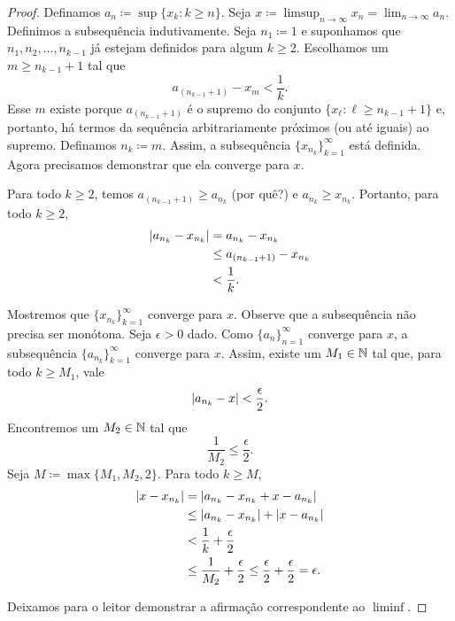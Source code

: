 \begin{proof}
Definamos $a_n \coloneqq \sup \{ x_k : k \geq n \}$.
Seja
$x \coloneqq \limsup_{n\to\infty} x_n = \lim_{n\to\infty} a_n$.
Definimos a subsequência indutivamente.
Seja $n_1 \coloneqq 1$ e suponhamos que $n_1,n_2,\ldots,n_{k-1}$ já estejam definidos para
algum $k \geq 2$. Escolhamos um $m \geq n_{k-1} + 1$
tal que
\begin{equation*}
a_{(n_{k-1}+1)} - x_m < \frac{1}{k} .
\end{equation*}
Esse $m$ existe
porque $a_{(n_{k-1}+1)}$ é o supremo do
conjunto $\{ x_\ell : \ell \geq n_{k-1} + 1 \}$ e, portanto, há termos
da sequência arbitrariamente próximos (ou até iguais) ao supremo.
Definamos $n_{k} \coloneqq m$. Assim, a subsequência $\{ x_{n_k} \}_{k=1}^\infty$ está definida. Agora
precisamos demonstrar que ela converge para $x$.

Para todo $k \geq 2$, temos
$a_{(n_{k-1}+1)} \geq a_{n_k}$ (por quê?) e $a_{n_{k}} \geq x_{n_k}$.
Portanto, para todo $k \geq 2$,
\begin{equation*}
\begin{split}
\lvert {a_{n_k} - x_{n_k}} \rvert & =
a_{n_k} - x_{n_k}
\\
& \leq
a_{(n_{k-1}+1)} - x_{n_k}
\\
& < \frac{1}{k} .
\end{split}
\end{equation*}

Mostremos que $\{ x_{n_k} \}_{k=1}^\infty$ converge para $x$.
Observe que a subsequência não precisa ser monótona. Seja $\epsilon > 0$ dado.
Como $\{ a_n \}_{n=1}^\infty$ converge para $x$, a subsequência
$\{ a_{n_k} \}_{k=1}^\infty$ converge para $x$.
Assim, existe um $M_1 \in {\mathbb{N}}$
tal que, para todo $k \geq M_1$, vale
\begin{equation*}
\lvert {a_{n_k} - x} \rvert < \frac{\epsilon}{2} .
\end{equation*}
Encontremos um $M_2 \in {\mathbb{N}}$ tal que
\begin{equation*}
\frac{1}{M_2} \leq \frac{\epsilon}{2}.
\end{equation*}
Seja $M \coloneqq \max \{M_1 , M_2 , 2 \}$. Para todo $k \geq M$,
\begin{equation*}
\begin{split}
\lvert {x- x_{n_k}} \rvert & =
\lvert {a_{n_k} - x_{n_k} + x - a_{n_k}} \rvert
\\
& \leq \lvert {a_{n_k} - x_{n_k}} \rvert + \lvert {x - a_{n_k}} \rvert
\\
& < \frac{1}{k} + \frac{\epsilon}{2}
\\
& \leq \frac{1}{M_2} + \frac{\epsilon}{2} \leq \frac{\epsilon}{2} +
\frac{\epsilon}{2} = \epsilon .
\end{split}
\end{equation*}

Deixamos para o leitor demonstrar a afirmação correspondente ao $\liminf$.
\end{proof}

